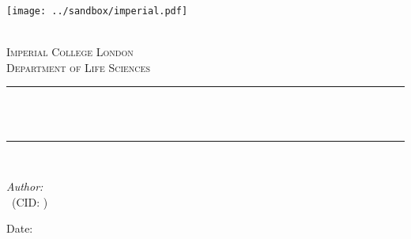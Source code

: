 \begin{titlepage}

    \newcommand{\HRule}{\rule{\linewidth}{0.5mm}} %
    
    
    \texttt{[image: ../sandbox/imperial.pdf]}\\[0.6cm] 
    
    \begin{center} %
    
    \textsc{\LARGE \reporttype}\\[1.5cm] 
    \textsc{\Large Imperial College London}\\[0.5cm] 
    \textsc{\large Department of Life Sciences}\\[0.5cm] 
    
    \HRule \\[0.4cm]
    { \huge \bfseries \reporttitle}\\ %
    \HRule \\[1.5cm]
    \end{center}
    
    \begin{flushleft} \large
    \textit{Author:}\\
    \reportauthor~(CID: \cid) %
    \end{flushleft}
    \vspace{2cm}
    \makeatletter
    Date: \@date 
    
    \vfill %
    
    
    
    \makeatother
    
    
    \end{titlepage}
    
    